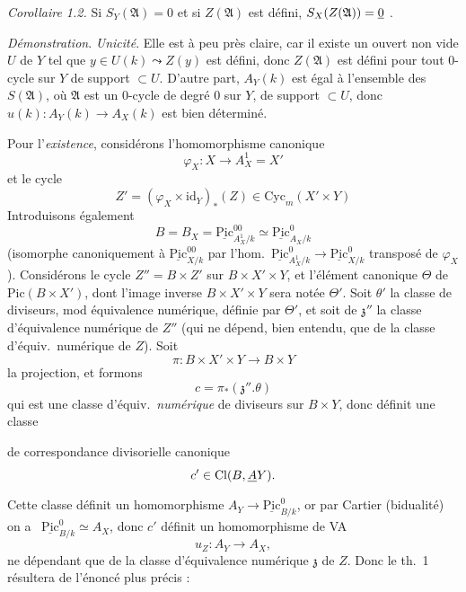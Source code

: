 \documentclass[11pt,a4paper]{article}
\begin{document}
\emph{Corollaire 1.2.} Si  $S_Y(\mathfrak{A}) = 0$ et si $Z(\mathfrak{A})$ est défini,  $S_X(Z(\mathfrak{A})) = \uncertain{0}$ .

\emph{Démonstration}. \emph{Unicité}. Elle est à peu près claire, car il existe un ouvert non vide $U$ de $Y$ tel que $y \in U(k) \leadsto Z(y)$ est défini,  donc $Z(\mathfrak{A})$ est défini pour tout $0$-cycle sur $Y$ de support $\subset U$. D'autre part, $A_Y(k)$ est égal à l'ensemble des $S(\mathfrak{A})$, où $\mathfrak{A}$ est un \struck{\ill{}} $0$-cycle de degré $0$ sur $Y$, de support $\subset U$, donc $u(k) : A_Y(k) \to A_X(k)$ est bien déterminé.

Pour l'\emph{existence}, considérons l'homomorphisme canonique
\[
  \varphi_X : X \longrightarrow A^{1}_{X} = X'
\]
et le cycle
\[
  Z' = (\varphi_X \times \mathrm{id}_Y)_{*}(Z) \in \mathrm{Cyc}_{m}(X' \times Y)
\]
Introduisons également
\[
  B = B_X = \underline{\mathrm{Pic}}^{00}_{A^{1}_{X}/k} \simeq \underline{\mathrm{Pic}}^{0}_{A_X/k}
\]
(isomorphe canoniquement à $\underline{\mathrm{Pic}}^{00}_{X/k}$ par l'hom.\ $\underline{\mathrm{Pic}}^{0}_{A^{1}_{X}/k} \to \underline{\mathrm{Pic}}^{0}_{X/k}$ transposé de $\varphi_X$). Considérons le cycle $Z'' = B \times Z'$ sur $B \times X' \times Y$, et l'élément canonique $\Theta$ de $\mathrm{Pic}(B \times X')$, dont l'image inverse   $B \times X' \times Y$ sera notée $\Theta'$. Soit  $\theta'$ la classe de diviseurs, mod équivalence numérique, définie par $\Theta'$, et soit de  $\mathfrak{z}''$ la classe d'équivalence numérique de $Z''$ (qui ne dépend, bien entendu, que de la classe d'équiv.\ numérique de $Z$). Soit
\[
  \pi : B \times X' \times Y \longrightarrow B \times Y
\]
la projection, et formons
\[
  c = \pi_{*}(\mathfrak{z}'' . \theta)
\]
qui est une classe d'équiv.\ \emph{numérique} de diviseurs sur $B \times Y$, donc définit une classe

de correspondance divisorielle canonique
\[
  c' \in \mathrm{Cl}(B, \struck{A} Y) .
\]
 Cette classe définit un homomorphisme  $A_Y \to \underline{\mathrm{Pic}}^{0}_{B/k}$, or par Cartier (bidualité) on a \ $\underline{\mathrm{Pic}}^{0}_{B/k} \simeq A_X$, donc $c'$ définit un \struck{\ill{}} homomorphisme de VA
\[
  u_Z : A_Y \longrightarrow A_X ,
\]
ne dépendant que de la classe d'équivalence numérique $\mathfrak{z}$ de $Z$. Donc le th.\ 1 résultera de l'énoncé plus précis :
\end{document}
